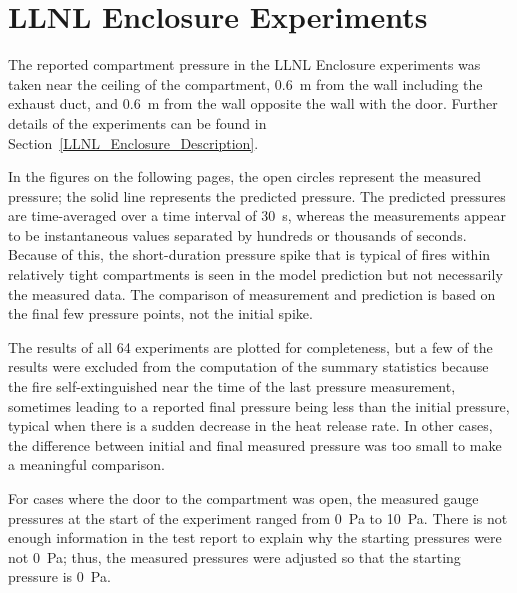 \clearpage

\section{LLNL Enclosure Experiments}

The reported compartment pressure in the LLNL Enclosure experiments was taken near the ceiling of the compartment, 0.6~m from the wall including the exhaust duct, and 0.6~m from the wall opposite the wall with the door. Further details of the experiments can be found in Section~\ref{LLNL_Enclosure_Description}.

In the figures on the following pages, the open circles represent the measured pressure; the solid line represents the predicted pressure. The predicted pressures are time-averaged over a time interval of 30~s, whereas the measurements appear to be instantaneous values separated by hundreds or thousands of seconds. Because of this, the short-duration pressure spike that is typical of fires within relatively tight compartments is seen in the model prediction but not necessarily the measured data. The comparison of measurement and prediction is based on the final few pressure points, not the initial spike.

The results of all 64 experiments are plotted for completeness, but a few of the results were excluded from the computation of the summary statistics because the fire self-extinguished near the time of the last pressure measurement, sometimes leading to a reported final pressure being less than the initial pressure, typical when there is a sudden decrease in the heat release rate. In other cases, the difference between initial and final measured pressure was too small to make a meaningful comparison.

For cases where the door to the compartment was open, the measured gauge pressures at the start of the experiment ranged from 0~Pa to 10~Pa. There is not enough information in the test report to explain why the starting pressures were not 0~Pa; thus, the measured pressures were adjusted so that the starting pressure is 0~Pa.

\newpage

